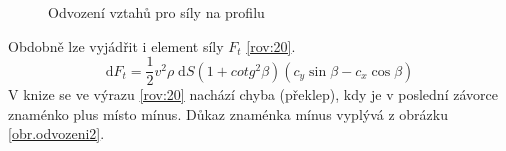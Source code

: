 \begin{figure}[H]
		\caption{Odvození vztahů pro síly na profilu}
	\end{figure}
	Obdobně lze vyjádřit i element síly $F_t$ \eqref{rov:20}\cite{Rychetnik:Motory}.
	\begin{equation}
			\label{rov:20}
			\mathrm{d}F_t=\frac{1}{2}v^2\rho\;\mathrm{d}S(1+cotg^2 \beta)(c_y \sin \beta - c_x \cos \beta)
	\end{equation}
	V knize \cite{Rychetnik:Motory} se ve výrazu \eqref{rov:20} nachází chyba (překlep), kdy je v poslední závorce znaménko plus místo mínus. Důkaz znaménka mínus vyplývá z obrázku \ref{obr.odvozeni2}.
	
